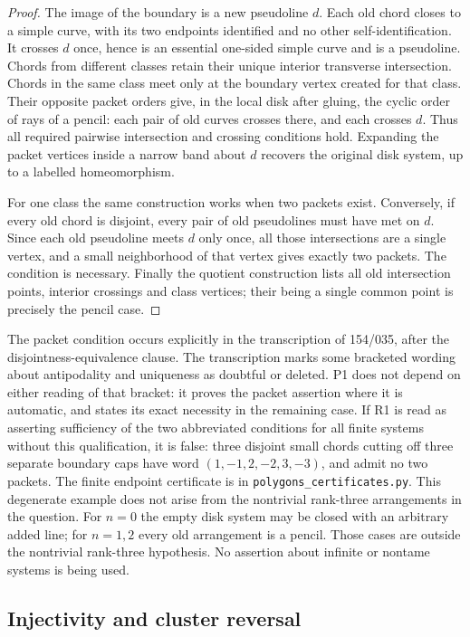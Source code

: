 \documentclass[11pt,a4paper]{article}
\begin{document}
\begin{proof}
The image of the boundary is a new pseudoline $d$.  Each old chord
closes to a simple curve, with its two endpoints identified and no
other self-identification.  It crosses $d$ once, hence is an essential
one-sided simple curve and is a pseudoline.  Chords from different
classes retain their unique interior transverse intersection.  Chords
in the same class meet only at the boundary vertex created for that
class.  Their opposite packet orders give, in the local disk after
gluing, the cyclic order of rays of a pencil: each pair of old curves
crosses there, and each crosses $d$.  Thus all required pairwise
intersection and crossing conditions hold.  Expanding the packet
vertices inside a narrow band about $d$ recovers the original disk
system, up to a labelled homeomorphism.

For one class the same construction works when two packets exist.
Conversely, if every old chord is disjoint, every pair of old
pseudolines must have met on $d$.  Since each old pseudoline meets
$d$ only once, all those intersections are a single vertex, and a
small neighborhood of that vertex gives exactly two packets.  The
condition is necessary.  Finally the quotient construction lists all
old intersection points, interior crossings and class vertices;
their being a single common point is precisely the pencil case.
\end{proof}

The packet condition occurs explicitly in the transcription of
154/035, after the disjointness-equivalence clause.  The transcription
marks some bracketed wording about antipodality and uniqueness as
doubtful or deleted.  P1 does not depend on either reading of that
bracket: it proves the packet assertion where it is automatic, and
states its exact necessity in the remaining case.  If R1 is read as
asserting sufficiency of the two abbreviated conditions for all finite
systems without this qualification, it is false: three disjoint small
chords cutting off three separate boundary caps have word
$(1,-1,2,-2,3,-3)$, and admit no two packets.  The finite endpoint
certificate is in \texttt{polygons\_certificates.py}.  This degenerate
example does not arise from the nontrivial rank-three arrangements in
the question.  For $n=0$ the empty disk system may be closed with an
arbitrary added line; for $n=1,2$ every old arrangement is a pencil.
Those cases are outside the nontrivial rank-three hypothesis.  No
assertion about infinite or nontame systems is being used.

\subsection{Injectivity and cluster reversal}
\end{document}

